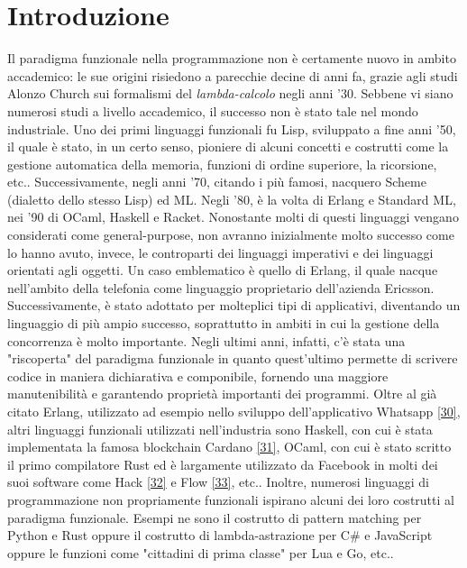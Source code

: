 \documentclass[10pt,a4paper]{article}
\begin{document}
\textwidth=450pt\oddsidemargin=0pt

\tableofcontents
\newpage

\section{Introduzione}
Il paradigma funzionale nella programmazione non è certamente nuovo in ambito accademico: le sue origini risiedono a
parecchie decine di anni fa, grazie agli studi Alonzo Church sui formalismi del \textit{lambda-calcolo} negli anni '30.
Sebbene vi siano numerosi studi a livello accademico, il successo non è stato tale nel mondo industriale. Uno dei primi
linguaggi funzionali fu Lisp, sviluppato a fine anni '50, il quale è stato, in un certo senso,
pioniere di alcuni concetti e costrutti come la gestione automatica della memoria, funzioni di ordine superiore, la
ricorsione, etc.. Successivamente, negli anni '70, citando i più famosi, nacquero Scheme (dialetto dello stesso Lisp) ed ML.
Negli '80, è la volta di Erlang e Standard ML, nei '90 di OCaml, Haskell e Racket. Nonostante molti di questi linguaggi
vengano considerati come general-purpose, non avranno inizialmente molto successo come lo hanno avuto, invece, le
controparti dei linguaggi imperativi e dei linguaggi orientati agli oggetti. Un caso emblematico è quello di
Erlang, il quale nacque nell'ambito della telefonia come linguaggio proprietario dell'azienda Ericsson. Successivamente,
è stato adottato per molteplici tipi di applicativi, diventando un linguaggio di più ampio successo, soprattutto in ambiti
in cui la gestione della concorrenza è molto importante. Negli ultimi anni, infatti, c'è stata una "riscoperta" del
paradigma funzionale in quanto quest'ultimo permette di scrivere codice in maniera dichiarativa e componibile, fornendo
una maggiore manutenibilità e garantendo proprietà importanti dei programmi. Oltre al già citato Erlang, utilizzato ad
esempio nello sviluppo dell'applicativo Whatsapp \hyperlink{bibl30}{[30]}, altri linguaggi funzionali utilizzati
nell'industria sono Haskell, con cui è stata implementata la famosa blockchain Cardano
\hyperlink{bibl31}{[31]}, OCaml, con cui è stato scritto il primo compilatore Rust ed è largamente utilizzato da Facebook
in molti dei suoi software come Hack
\hyperlink{bibl32}{[32]} e Flow \hyperlink{bibl33}{[33]}, etc.. Inoltre, numerosi linguaggi di programmazione non
propriamente funzionali ispirano alcuni dei loro costrutti al paradigma funzionale. Esempi ne sono il costrutto di
pattern matching per Python e Rust oppure il costrutto di lambda-astrazione per C# e JavaScript oppure le
funzioni come "cittadini di prima classe" per Lua e Go, etc..
\end{document}
